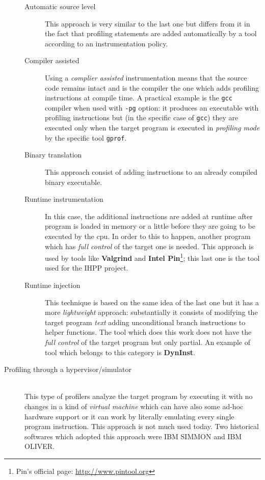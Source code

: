 \documentclass[a4paper,10pt]{report}
\begin{document}
\begin{description}
\begin{description}
\item[Automatic source level] This approach is very similar to the last one but
differs from it in the fact that profiling statements are added automatically by
a tool according to an instrumentation policy.

\item[Compiler assisted] Using a \emph{complier assisted} instrumentation means
that the source code remains intact and is the compiler the one which adds
profiling instructions at compile time. A practical example is the \verb|gcc| compiler when
used with \verb|-pg| option: it produces an executable with profiling
instructions but (in the specific case of \verb|gcc|) they are executed only when the
target program is executed in \emph{profiling mode} by the specific tool
\verb|gprof|.

\item[Binary translation]
This approach consist of adding instructions to an already compiled binary executable.

\item[Runtime instrumentation]
In this case, the additional instructions are added at runtime after program is
loaded in memory or a little before they are going to be executed by the
cpu. In order to this to happen, another program which has \emph{full control}
of the target one is needed. This approach is used by tools like
\textbf{Valgrind} and \textbf{Intel Pin}\footnote{Pin's official page:
\url{http://www.pintool.org}}; this last one is the tool used for the IHPP
project.

\item[Runtime injection] This technique is based on the same idea of the last
one but it has a more \emph{lightweight} approach: substantially it consists of
modifying the target program \emph{text} adding unconditional branch
instructions to helper functions. The tool which does this work does not have the
\emph{full control} of the target program but only partial. An example of tool
which belongs to this category is \textbf{DynInst}.

\end{description}

\item[Profiling through a hypervisor/simulator] \hfill \\
This type of profilers analyze the target program by executing it with no
changes in a kind of \emph{virtual machine} which can have also some ad-hoc
hardware support or it can work by literally emulating every single program
instruction. This approach is not much used today. Two historical softwares
which adopted this approach were IBM SIMMON and IBM OLIVER.

\end{description}
\end{document}
